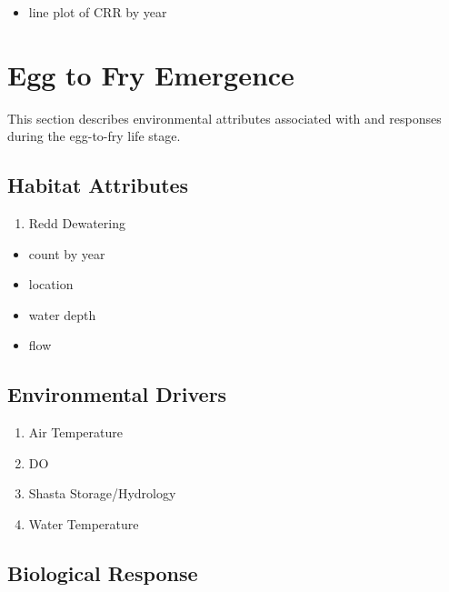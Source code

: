 \documentclass[
]{book}
\providecommand{\tightlist}{%
  \setlength{\itemsep}{0pt}\setlength{\parskip}{0pt}}
\theoremstyle{definition}
\theoremstyle{definition}
\theoremstyle{definition}
\theoremstyle{definition}
\theoremstyle{remark}
\begin{document}
\begin{itemize}
\tightlist
\item
  line plot of CRR by year
\end{itemize}

\hypertarget{egg-to-fry-emergence}{%
\chapter{Egg to Fry Emergence}\label{egg-to-fry-emergence}}

This section describes environmental attributes associated with and responses during the egg-to-fry life stage.

\hypertarget{habitat-attributes-1}{%
\section{Habitat Attributes}\label{habitat-attributes-1}}

\begin{enumerate}
\def\labelenumi{\arabic{enumi}.}
\tightlist
\item
  Redd Dewatering
\end{enumerate}

\begin{itemize}
\tightlist
\item
  count by year
\item
  location
\item
  water depth
\item
  flow
\end{itemize}

\hypertarget{environmental-drivers}{%
\section{Environmental Drivers}\label{environmental-drivers}}

\begin{enumerate}
\def\labelenumi{\arabic{enumi}.}
\item
  Air Temperature
\item
  DO
\item
  Shasta Storage/Hydrology
\item
  Water Temperature
\end{enumerate}

\hypertarget{biological-response-1}{%
\section{Biological Response}\label{biological-response-1}}
\end{document}
